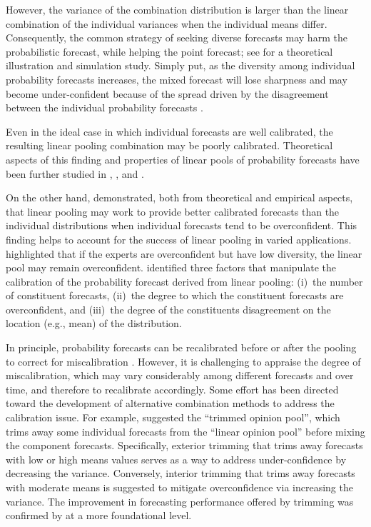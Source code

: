 \documentclass[a4paper,11pt]{article}
\begin{document}
However, the variance of the combination distribution is larger than the linear combination of the individual variances when the individual means differ. Consequently, the common strategy of seeking diverse forecasts may harm the probabilistic forecast, while helping the point forecast; see \citet{Ranjan2010-jl} for a theoretical illustration and simulation study. Simply put, as the diversity among individual probability forecasts increases, the mixed forecast will lose sharpness and may become under-confident because of the spread driven by the disagreement between the individual probability forecasts \citep{Hora2004-fz,Wallis2005-yf,Ranjan2010-jl}.

Even in the ideal case in which individual forecasts are well calibrated, the resulting linear pooling combination may be poorly calibrated. Theoretical aspects of this finding and properties of linear pools of probability forecasts have been further studied in \citet{Hora2004-fz}, \citet{Ranjan2010-jl}, and \citet{Lichtendahl2013-rt}.

On the other hand, \citet{Hora2004-fz} demonstrated, both from theoretical and empirical aspects, that linear pooling may work to provide better calibrated forecasts than the individual distributions when individual forecasts tend to be overconfident. This finding helps to account for the success of linear pooling in varied applications. \citet{Jose2014-uh} highlighted that if the experts are overconfident but have low diversity, the linear pool may remain overconfident. \citet{Lichtendahl2013-rt} identified three factors that manipulate the calibration of the probability forecast derived from linear pooling: (i)~the number of constituent forecasts, (ii)~the degree to which the constituent forecasts are overconfident, and (iii)~the degree of the constituents disagreement on the location (e.g., mean) of the distribution.

In principle, probability forecasts can be recalibrated before or after the pooling to correct for miscalibration \citep{Turner2014-za}. However, it is challenging to appraise the degree of miscalibration, which may vary considerably among different forecasts and over time, and therefore to recalibrate accordingly. Some effort has been directed toward the development of alternative combination methods to address the calibration issue. For example, \citet{Jose2014-uh} suggested the ``trimmed opinion pool'', which trims away some individual forecasts from the ``linear opinion pool'' before mixing the component forecasts. Specifically, exterior trimming that trims away forecasts with low or high means values serves as a way to address under-confidence by decreasing the variance. Conversely, interior trimming that trims away forecasts with moderate means is suggested to mitigate overconfidence via increasing the variance. The improvement in forecasting performance offered by trimming was confirmed by \citet{Grushka-Cockayne2017-dj} at a more foundational level.
\end{document}
